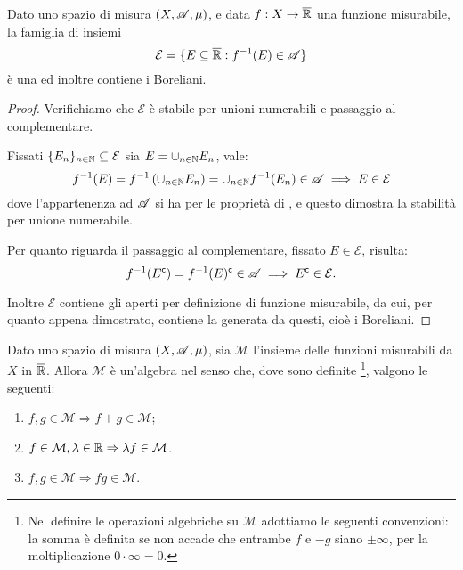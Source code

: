 \begin{proposition}
	\label{CounterImgMis}
	Dato uno spazio di misura $(X,\mathscr A,\mu)$, e data $f:X\rightarrow \overline{\mathbb R}$ una funzione misurabile, la famiglia di insiemi
	\[
		\mathcal{E} = \{ E\subseteq \overline{\mathbb R} : f^{-1}(E)\in \mathscr A \}
	\]
	è una \sigalg{} ed inoltre contiene i Boreliani.
\end{proposition}
\begin{proof}
	Verifichiamo che $\mathcal E$ è stabile per unioni numerabili e passaggio al complementare.
	
	Fissati $\{E_n\}_{n\in \mathbb N}\subseteq \mathcal{E}$ sia $E = \cup_{n\in \mathbb N}E_n$, vale:
	\begin{equation*}
		f^{-1}(E)=f^{-1}\left(\cup_{n\in \mathbb N}E_n\right) = \cup_{n\in \mathbb N}f^{-1}(E_n)\in \mathscr A \implies E \in \mathcal{E}
	\end{equation*}
	dove l'appartenenza ad $\mathscr A$ si ha per le proprietà di \sigalg{}, e questo dimostra la stabilità per unione numerabile.
	
	Per quanto riguarda il passaggio al complementare, fissato $E\in \mathcal{E}$, risulta:
	\begin{equation*}
		f^{-1}(E^\mathsf{c})= f^{-1}(E)^\mathsf{c} \in \mathscr A \implies E^\mathsf{c} \in \mathcal{E}.
	\end{equation*}
	
	Inoltre $\mathcal E$ contiene gli aperti per definizione di funzione misurabile, da cui, per quanto appena dimostrato, contiene la \sigalg{} generata da questi, cioè i Boreliani.
\end{proof}

\begin{proposition}
	\label{AlgMis}
	Dato uno spazio di misura $(X,\mathscr A,\mu)$, sia $\mathcal{M}$ l'insieme delle funzioni misurabili da $X$ in $\overline{\mathbb R}$.
	Allora $\mathcal{M}$ è un'algebra nel senso che, dove sono definite \footnote{Nel definire le operazioni algebriche su $\mathcal{M}$ adottiamo le seguenti convenzioni: la somma è definita
		se non accade che entrambe $f$ e $-g$ siano $\pm\infty$, per la moltiplicazione $0\cdot \infty = 0$.},
	valgono le seguenti:
	\begin{enumerate}[label=(\arabic*),ref=(\arabic*)]
		\item $f,g\in \mathcal{M} \Rightarrow f+g\in \mathcal{M}$; \label{AlM:sum}
		\item $f\in \mathcal{M}, \lambda \in \mathbb R \Rightarrow \lambda f\in \mathcal{M}$. \label{AlM:sca}
		\item $f,g\in \mathcal{M} \Rightarrow fg\in \mathcal{M}$. \label{AlM:pro}
	\end{enumerate}
\end{proposition}


